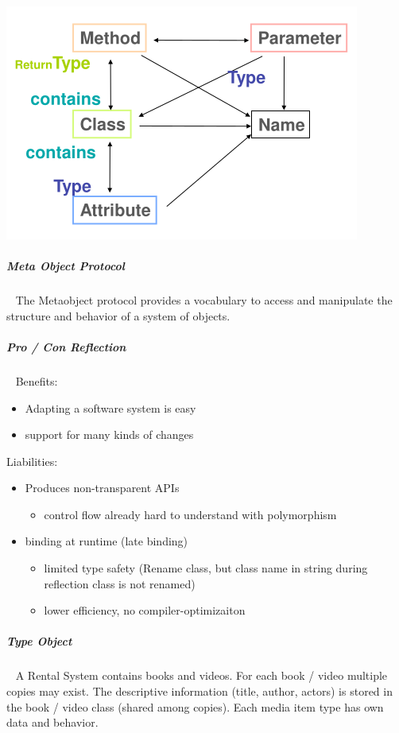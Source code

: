 \documentclass[11pt,twoside,landscape]{article}
\begin{document}
\begin{multicols}{3}
{
\begin{center}
\includegraphics[width=.9\linewidth]{img/meta_object_relationships.png}
\end{center}
\label{fig:meta-object-class-relations}
}
\subparagraph{Meta Object Protocol} \
\label{sec:orgc85d023}
The Metaobject protocol provides a vocabulary to access and manipulate the structure and behavior of a system of objects.
\subparagraph{Pro / Con Reflection} \
\label{sec:org476fe60}
Benefits:
\begin{itemize}
\item Adapting a software system is easy
\item support for many kinds of changes
\end{itemize}


Liabilities:
\begin{itemize}
\item Produces non-transparent APIs
\begin{itemize}
\item control flow already hard to understand with polymorphism
\end{itemize}
\item binding at runtime (late binding)
\begin{itemize}
\item limited type safety (Rename class, but class name in string during reflection class is not renamed)
\item lower efficiency, no compiler-optimizaiton
\end{itemize}
\end{itemize}
\subparagraph{Type Object} \
\label{sec:orge3602a3}
A Rental System contains books and videos.
For each book / video multiple copies may exist.
The descriptive information (title, author, actors) is stored in the book / video class (shared among copies).
Each media item type has own data and behavior.


\end{multicols}
\end{document}

